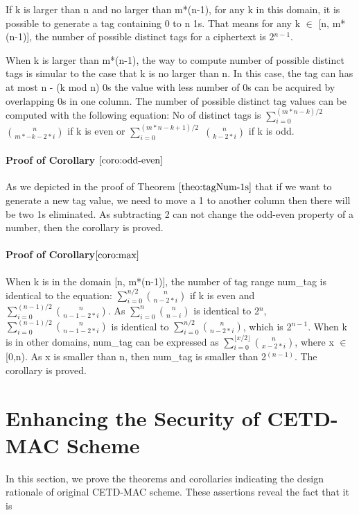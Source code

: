 \documentclass{article}
\begin{document}
If k is larger than n and no larger than m*(n-1), for any k in this domain, it is possible to generate a tag containing 0 to n 1s. That means for any k $\in$ [n, m*(n-1)], the number of possible distinct tags for a ciphertext is 2$^{n-1}$. 

When k is larger than m*(n-1), the way to compute number of possible distinct tags is simular to the case that k is no larger than n. In this case, the tag can has at most n - (k mod n) 0s the value with less number of 0s can be acquired by overlapping 0s in one column. The number of possible distinct tag values can be computed with the following equation:
No of distinct tags is $\sum_{i=0}^{(m*n-k)/2}$ $\binom{n}{m*-k-2*i}$ if k is even or $\sum_{i=0}^{(m*n-k+1)/2}$ $\binom{n}{k-2*i}$ if k is odd.

\paragraph{Proof of Corollary $\ref{coro:odd-even}$}
As we depicted in the proof of Theorem $\ref{theo:tagNum-1s}$ that if we want to generate a new tag value, we need to move a 1 to another column then there will be two 1s eliminated. As subtracting 2 can not change the odd-even property of a number, then the corollary is proved.
\paragraph{Proof of Corollary$\ref{coro:max}$}
When k is in the domain [n, m*(n-1)], the number of tag range num\_tag is identical to the equation: $\sum_{i=0}^{n/2} \binom{n}{n-2*i}$ if k is even and $\sum_{i=0}^{(n-1)/2} \binom{n}{n-1-2*i}$. As $\sum_{i=0}^{n} \binom{n}{n-i}$ is identical to 2$^n$, $\sum_{i=0}^{(n-1)/2} \binom{n}{n-1-2*i}$ is identical to $\sum_{i=0}^{n/2} \binom{n}{n-2*i}$, which is 2$^{n-1}$. 
When k is in other domains, num\_tag can be expressed as $\sum_{i=0}^{\lfloor x/2 \rfloor} \binom{n}{x-2*i}$, where x $\in$ [0,n). As x is smaller than n, then num\_tag is smaller than 2$^(n-1)$. The corollary is proved. 

%
\section{Enhancing the Security of CETD-MAC Scheme}
In this section, we prove the theorems and corollaries indicating the design rationale of original CETD-MAC scheme. These assertions reveal the fact that it is 
\end{document}

